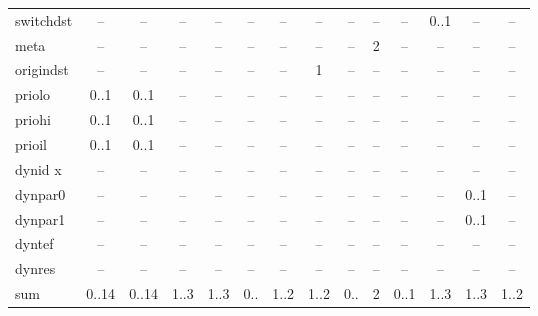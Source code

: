 \begin{table}
\begin{adjustwidth}{-24mm}{}
\begin{tabular}[t]{|L|c|c|c|c|c|c|c|c|c|c|c|c|c|}
switchdst           & --         & --              & --        & --         & --           & --        & --          & --        & --         & --               & 0..1        & --        & --        \\
meta                & --         & --              & --        & --         & --           & --        & --          & --        & 2          & --               & --          & --        & --        \\
origindst           & --         & --              & --        & --         & --           & --        & 1           & --        & --         & --               & --          & --        & --        \\
priolo              & 0..1       & 0..1            & --        & --         & --           & --        & --          & --        & --         & --               & --          & --        & --        \\
priohi              & 0..1       & 0..1            & --        & --         & --           & --        & --          & --        & --         & --               & --          & --        & --        \\
prioil              & 0..1       & 0..1            & --        & --         & --           & --        & --          & --        & --         & --               & --          & --        & --        \\
dynid x             & --         & --              & --        & --         & --           & --        & --          & --        & --         & --               & --          & --        & --        \\
dynpar0             & --         & --              & --        & --         & --           & --        & --          & --        & --         & --               & --          & 0..1      & --        \\
dynpar1             & --         & --              & --        & --         & --           & --        & --          & --        & --         & --               & --          & 0..1      & --        \\
dyntef              & --         & --              & --        & --         & --           & --        & --          & --        & --         & --               & --          & --        & --        \\
dynres              & --         & --              & --        & --         & --           & --        & --          & --        & --         & --               & --          & --        & --        \\
\hline
sum                 & 0..14      & 0..14           & 1..3      & 1..3       & 0..          & 1..2      & 1..2        & 0..       & 2          & 0..1             & 1..3        & 1..3      & 1..2      \\
\hline
\end{tabular}
\end{adjustwidth}
\end{table}
